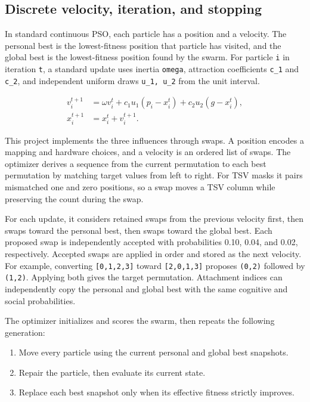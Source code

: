 \documentclass[11pt,a4paper]{article}
\begin{document}
\subsection{Discrete velocity, iteration, and stopping}

In standard continuous PSO, each particle has a position and a velocity. The personal best is the lowest-fitness position that particle has visited, and the global best is the lowest-fitness position found by the swarm. For particle \texttt{i} in iteration \texttt{t}, a standard update uses inertia \texttt{omega}, attraction coefficients \texttt{c\_1} and \texttt{c\_2}, and independent uniform draws \texttt{u\_1, u\_2} from the unit interval.

\[
\begin{aligned}
v_i^{t+1} &= \omega v_i^t
  + c_1 u_1(p_i-x_i^t)
  + c_2 u_2(g-x_i^t), \\
x_i^{t+1} &= x_i^t + v_i^{t+1}.
\end{aligned}
\]

This project implements the three influences through swaps. A position encodes a mapping and hardware choices, and a velocity is an ordered list of swaps. The optimizer derives a sequence from the current permutation to each best permutation by matching target values from left to right. For TSV masks it pairs mismatched one and zero positions, so a swap moves a TSV column while preserving the count during the swap.

For each update, it considers retained swaps from the previous velocity first, then swaps toward the personal best, then swaps toward the global best. Each proposed swap is independently accepted with probabilities 0.10, 0.04, and 0.02, respectively. Accepted swaps are applied in order and stored as the next velocity. For example, converting \texttt{[0,1,2,3]} toward \texttt{[2,0,1,3]} proposes \texttt{(0,2)} followed by \texttt{(1,2)}. Applying both gives the target permutation. Attachment indices can independently copy the personal and global best with the same cognitive and social probabilities.

The optimizer initializes and scores the swarm, then repeats the following generation:

\begin{enumerate}
\item Move every particle using the current personal and global best snapshots.
\item Repair the particle, then evaluate its current state.
\item Replace each best snapshot only when its effective fitness strictly improves.
\end{enumerate}
\end{document}
